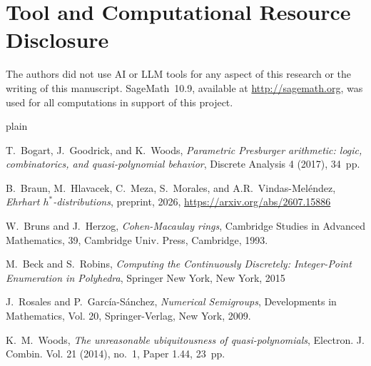 \documentclass[12pt]{amsart}
\theoremstyle{definition}
\numberwithin{equation}{section}
\renewcommand\>{\rangle}
\newcommand\<{\langle}
\newcommand\0{\mathbf{0}}
\begin{document}
\section{Tool and Computational Resource Disclosure}

The authors did not use AI or LLM tools for any aspect of this research or the writing of this manuscript.
SageMath~10.9, available at \url{http://sagemath.org}, was used for all computations in support of this project.

\begin{thebibliography}{plain}


T.~Bogart, J.~Goodrick, and K.~Woods, 
\emph{Parametric Presburger arithmetic: logic, combinatorics, and quasi-polynomial behavior}, 
Discrete Analysis 4 (2017), 34~pp.

B.~Braun, M.~Hlavacek, C.~Meza, S.~Morales, and A.R.~Vindas-Mel\'endez,
\emph{Ehrhart $h^*$-distributions},
preprint, 2026, \url{https://arxiv.org/abs/2607.15886}

W.~Bruns and J.~Herzog, 
\emph{Cohen-Macaulay rings}, 
Cambridge Studies in Advanced Mathematics, 39, Cambridge Univ. Press, Cambridge, 1993.

M.~Beck and S.~Robins,
\emph{Computing the Continuously Discretely: Integer-Point Enumeration in Polyhedra},
Springer New York, New York, 2015

J.~Rosales and P.~Garc\'ia-S\'anchez, 
\emph{Numerical {S}emigroups}, 
Developments in Mathematics, Vol. 20, Springer-Verlag, New York, 2009.

K.~M.~Woods, 
\emph{The unreasonable ubiquitousness of quasi-polynomials}, 
Electron. J. Combin. Vol. 21 (2014), no.~1, Paper 1.44, 23~pp.

\end{thebibliography}%

\end{document}
